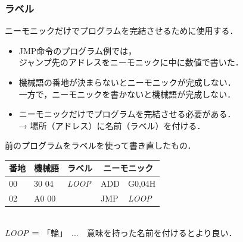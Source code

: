\documentclass[handout]{beamer}        %
\begin{document}
\begin{frame}
  \frametitle{ラベル}
  ニーモニックだけでプログラムを完結させるために使用する．
  \vfill
  \begin{itemize}
  \item JMP命令のプログラム例では，\\
    ジャンプ先のアドレスをニーモニックに中に数値で書いた．
  \vfill
  \item 機械語の番地が決まらないとニーモニックが完成しない．\\
    一方で，ニーモニックを書かないと機械語が完成しない．
  \vfill
  \item ニーモニックだけでプログラムを完結させる必要がある．\\
    →  場所（アドレス）に名前（ラベル）を付ける．
  \end{itemize}
  \vfill

  前のプログラムをラベルを使って書き直したもの．
  {\ttfamily\small\begin{center}
    \begin{tabular}{|l|l|l|l l|} \hline
      番地 & 機械語 & ラベル & \multicolumn{2}{|c|}{ニーモニック} \\
      \hline
      00 & 30 04 & \emph{LOOP} & ADD  & G0,04H      \\
      02 & A0 00 &             & JMP  & \emph{LOOP} \\
      \hline
    \end{tabular}\\
    \emph{LOOP} ＝ 「輪」　...　意味を持った名前を付けるとより良い．
  \end{center}}
  \vfill
\end{frame}
\end{document}
